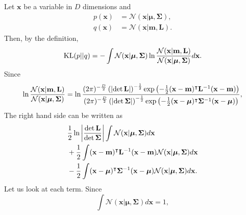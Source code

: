 \subsection{}
\label{2.13}
Let $\mathbf{x}$ be a variable in $D$ dimensions and
%
\begin{equation}
\begin{aligned}
p(\mathbf{x}) 
&= 
\mathcal{N} (\mathbf{x} | \bm{\mu}, \bm{\Sigma}), 
\\
q(\mathbf{x}) 
&= 
\mathcal{N} (\mathbf{x} | \mathbf{m}, \mathbf{L}).
\end{aligned}
\end{equation}
%
Then, by the definition,
%
\begin{equation}
{\rm KL} (p || q) 
= 
- 
\int 
\mathcal{N} (\mathbf{x} | \bm{\mu}, \bm{\Sigma}) 
\ln 
\frac
{\mathcal{N} (\mathbf{x} | \mathbf{m}, \mathbf{L})}
{\mathcal{N} (\mathbf{x} | \bm{\mu}, \bm{\Sigma})} 
d\mathbf{x}.
\end{equation}
%
Since
%
\begin{equation}
\ln 
\frac
{\mathcal{N} (\mathbf{x} | \mathbf{m}, \mathbf{L})}
{\mathcal{N} (\mathbf{x} | \bm{\mu}, \bm{\Sigma})} 
= 
\ln 
\frac
{(2 \pi) ^ {- \frac{D}{2}} 
\left( 
	\abs{\det \mathbf{L}} 
\right) ^ {- \frac{1}{2}} 
\exp 
\left( 
	- 
	\frac{1}{2} 
	(\mathbf{x} - \mathbf{m}) ^ \intercal 
	\mathbf{L} ^ {- 1} 
	(\mathbf{x} - \mathbf{m}) 
\right)}
{(2 \pi) ^ {- \frac{D}{2}} 
\left( 
	\abs{\det \bm{\Sigma}} 
\right) ^ {- \frac{1}{2}} 
\exp 
\left( 
	- 
	\frac{1}{2} 
	(\mathbf{x} - \bm{\mu}) ^ \intercal 
	\bm{\Sigma} ^ {- 1} 
	(\mathbf{x} - \bm{\mu}) 
\right)},
\end{equation}
%
The right hand side can be written as
%
\begin{equation}
\begin{aligned}
&
\frac{1}{2} 
\ln 
\abs{\frac{\det \mathbf{L}}{\det \bm{\Sigma}}} 
\int 
\mathcal{N} (\mathbf{x} | \bm{\mu}, \bm{\Sigma}) 
d\mathbf{x} 
\\
&
+ 
\frac{1}{2}
\int 
(\mathbf{x} - \mathbf{m}) ^ \intercal 
\mathbf{L} ^ {- 1} 
(\mathbf{x} - \mathbf{m}) 
\mathcal{N} (\mathbf{x} | \bm{\mu}, \bm{\Sigma}) 
d\mathbf{x} 
\\
&
- 
\frac{1}{2} 
\int 
(\mathbf{x} - \bm{\mu}) ^ \intercal 
\bm{\Sigma} ^ {- 1} 
(\mathbf{x} - \bm{\mu}) 
\mathcal{N} (\mathbf{x} | \bm{\mu}, \bm{\Sigma}) 
d\mathbf{x}.
\end{aligned}
\end{equation}
%
Let us look at each term.
Since
%
\begin{equation}
\int 
\mathcal{N} (\mathbf{x} | \bm{\mu}, \bm{\Sigma}) 
d\mathbf{x} 
= 
1,
\end{equation}
